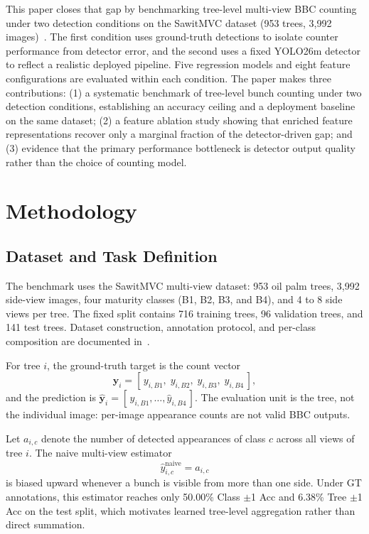﻿\documentclass[conference]{IEEEtran}
\begin{document}
This paper closes that gap by benchmarking tree-level multi-view BBC counting
under two detection conditions on the SawitMVC dataset (953 trees, 3,992
images)~\cite{refIndriani2026}. The first condition uses ground-truth detections to isolate counter
performance from detector error, and the second uses a fixed YOLO26m detector
to reflect a realistic deployed pipeline. Five regression models and eight
feature configurations are evaluated within each condition. The paper makes
three contributions: (1) a systematic benchmark of tree-level bunch counting
under two detection conditions, establishing an accuracy ceiling and a
deployment baseline on the same dataset; (2) a feature ablation study showing
that enriched feature representations recover only a marginal fraction of the
detector-driven gap; and (3) evidence that the primary performance bottleneck
is detector output quality rather than the choice of counting model.

\section{Methodology}

\subsection{Dataset and Task Definition}
\label{sec:task}

The benchmark uses the SawitMVC multi-view dataset: 953 oil palm trees,
3,992 side-view images, four maturity classes (B1, B2, B3, and B4), and 4 to
8 side views per tree. The fixed split contains 716 training trees, 96
validation trees, and 141 test trees. Dataset construction, annotation
protocol, and per-class composition are documented in~\cite{refIndriani2026}.

For tree $i$, the ground-truth target is the count vector
\begin{equation}
  \mathbf{y}_i = [\,y_{i,B1},\;y_{i,B2},\;y_{i,B3},\;y_{i,B4}\,],
\end{equation}
and the prediction is $\hat{\mathbf{y}}_i =
[\,\hat{y}_{i,B1},\ldots,\hat{y}_{i,B4}\,]$. The evaluation unit is the tree,
not the individual image: per-image appearance counts are not valid BBC outputs.

Let $a_{i,c}$ denote the number of detected appearances of class $c$ across
all views of tree $i$. The naive multi-view estimator
\begin{equation}
  \hat{y}_{i,c}^{\text{naive}} = a_{i,c}
\end{equation}
is biased upward whenever a bunch is visible from more than one side. Under GT
annotations, this estimator reaches only 50.00\% Class $\pm$1 Acc and 6.38\%
Tree $\pm$1 Acc on the test split, which motivates learned tree-level
aggregation rather than direct summation.
\end{document}
